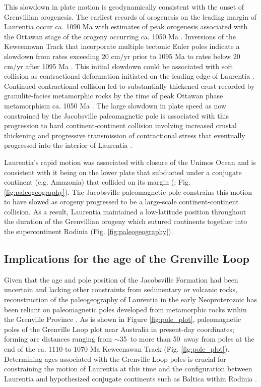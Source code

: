 This slowdown in plate motion is geodynamically consistent with the onset of Grenvillian orogenesis. The earliest records of orogenesis on the leading margin of Laurentia occur ca. 1090 Ma with estimates of peak orogenesis associated with the Ottawan stage of the orogeny occurring ca. 1050 Ma \citep{Rivers2012a, Swanson-Hysell2023a}. Inversions of the Keweenawan Track that incorporate multiple tectonic Euler poles indicate a slowdown from rates exceeding 20 cm/yr prior to 1095 Ma to rates below 20 cm/yr after 1095 Ma \citep{Swanson-Hysell2019a, Rose2022a}. This initial slowdown could be associated with soft collision as contractional deformation initiated on the leading edge of Laurentia \citep{Staal2020a}. Continued contractional collision led to substantially thickened crust recorded by granulite-facies metamorphic rocks by the time of peak Ottawan phase metamorphism ca. 1050 Ma \citep{Rivers2012a}. The large slowdown in plate speed as now constrained by the Jacobsville paleomagnetic pole is associated with this progression to hard continent-continent collision involving increased crustal thickening and progressive transmission of contractional stress that eventually progressed into the interior of Laurentia \citep{Cannon1994a}.

Laurentia's rapid motion was associated with closure of the Unimos Ocean and is consistent with it being on the lower plate that subducted under a conjugate continent (e.g. Amazonia) that collided on its margin (\cite{Swanson-Hysell2023a}; Fig. \ref{fig:paleogeography}). The Jacobsville paleomagnetic pole constrains this motion to have slowed as orogeny progressed to be a large-scale continent-continent collision. As a result, Laurentia maintained a low-latitude position throughout the duration of the Grenvillian orogeny which sutured continents together into the supercontinent Rodinia (Fig. \ref{fig:paleogeography}). 

\subsection*{Implications for the age of the Grenville Loop}

Given that the age and pole position of the Jacobsville Formation had been uncertain and lacking other constraints from sedimentary or volcanic rocks, reconstruction of the paleogeography of Laurentia in the early Neoproterozoic has been reliant on paleomagnetic poles developed from metamorphic rocks within the Grenville Province \cite[e.g.][]{Weil1998a}. As is shown in Figure \ref{fig:pole_plot}, paleomagnetic poles of the Grenville Loop plot near Australia in present-day coordinates; forming arc distances ranging from $\sim$35\textdegree\ to more than 50\textdegree\ away from poles at the end of the ca. 1110 to 1070 Ma Keweenawan Track (Fig. \ref{fig:pole_plot}). Determining ages associated with the Grenville Loop poles is crucial for constraining the motion of Laurentia at this time and the configuration between Laurentia and hypothesized conjugate continents such as Baltica within Rodinia \citep{Cawood2017a, Gong2018a, Swanson-Hysell2021c}.

